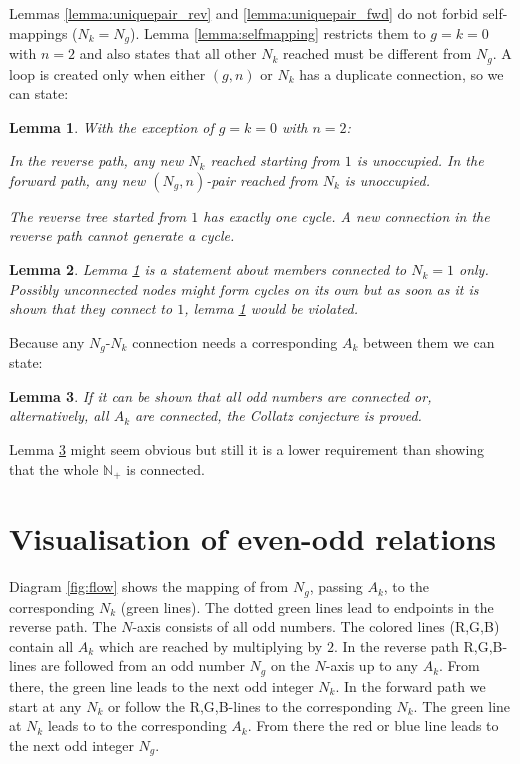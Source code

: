 \documentclass[10pt,a4paper]{article}
\newtheorem{lemma}{Lemma}
\begin{document}
Lemmas \ref{lemma:uniquepair_rev} and \ref{lemma:uniquepair_fwd} do not forbid self-mappings ($N_k=N_g$). Lemma \ref{lemma:selfmapping} restricts them to $g=k=0$ with $n=2$ and also states that all other $N_k$ reached must be different from $N_g$.
A loop is created only when either $(g,n)$ or $N_k$ has a duplicate connection, so we can state:
\begin{lemma}
With the exception of $g=k=0$ with $n=2$:

In the reverse path, any new $N_k$ reached starting from $1$ is unoccupied.
In the forward path, any new $(N_g,n)$-pair reached from $N_k$ is unoccupied.

The reverse tree started from $1$ has exactly one cycle. A new connection in the reverse path cannot generate a cycle.
\label{lemma:loopfree}
\end{lemma}
\begin{lemma}
Lemma \ref{lemma:loopfree} is a statement about members connected to $N_k=1$ only. Possibly unconnected nodes might form cycles on its own but as soon as it is shown that they connect to $1$, lemma \ref{lemma:loopfree} would be violated.
\label{lemma:loopfree_only_conn_to_1}
\end{lemma}

Because any $N_g$-$N_k$ connection needs a corresponding $A_k$ between them we can state:
\begin{lemma}
If it can be shown that all odd numbers are connected or, alternatively, all $A_k$ are connected, the Collatz conjecture is proved.
\label{lemma:all_conn}
\end{lemma}
Lemma \ref{lemma:all_conn} might seem obvious but still it is a lower requirement than showing that the whole $\mathbb{N}_+$ is connected.

\section{Visualisation of even-odd relations}
Diagram \ref{fig:flow} shows the mapping of from $N_g$, passing $A_k$, to the corresponding $N_k$ (green lines). The dotted green lines lead to endpoints in the reverse path.
The $N$-axis consists of all odd numbers. The colored lines (R,G,B) contain all $A_k$ which are reached by multiplying by $2$.
In the reverse path R,G,B-lines are followed from an odd number $N_g$ on the $N$-axis up to any $A_k$. From there, the green line leads to the next odd integer $N_k$.
In the forward path we start at any $N_k$ or follow the R,G,B-lines to the corresponding $N_k$. The green line at $N_k$ leads to to the corresponding $A_k$. From there the red or blue line leads to the next odd integer $N_g$.
\end{document}
